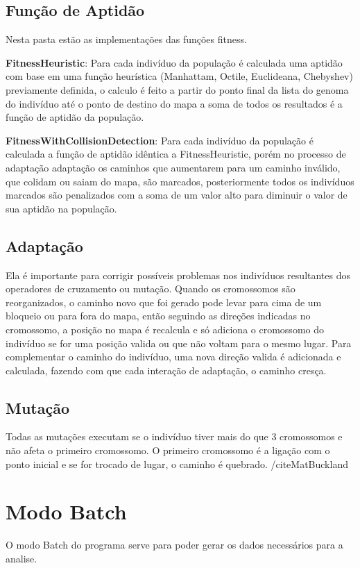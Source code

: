 \subsection{Função de Aptidão}

Nesta pasta estão as implementações das funções fitness.

\textbf{FitnessHeuristic}: Para cada indivíduo da população é calculada uma aptidão com base em uma função heurística (Manhattam, Octile, Euclideana, Chebyshev)
previamente definida, o calculo é feito a partir do ponto final da lista do genoma do indivíduo até o ponto de destino do mapa
a soma de todos os resultados é a função de aptidão da população.

\textbf{FitnessWithCollisionDetection}: Para cada indivíduo da população é calculada a função de aptidão idêntica a FitnessHeuristic, porém no processo de adaptação adaptação os caminhos que aumentarem para um caminho inválido, que colidam ou saiam do mapa, são marcados,
posteriormente todos os indivíduos marcados são penalizados com a  soma de  um valor alto para diminuir o valor de sua aptidão na população.

\subsection{Adaptação}

Ela é importante para corrigir possíveis problemas nos indivíduos resultantes dos operadores de cruzamento ou mutação. Quando os cromossomos são reorganizados, 
o caminho novo que foi gerado pode levar para cima de um bloqueio ou para fora do mapa, então seguindo as direções indicadas no cromossomo, 
a posição no mapa é recalcula e só adiciona o cromossomo do indivíduo se for uma posição valida ou que não voltam para o mesmo lugar.
Para complementar o caminho do indivíduo, uma nova direção valida é adicionada e calculada, fazendo com que cada interação de adaptação, o caminho cresça.

\subsection{Mutação}

Todas as mutações executam se o indivíduo tiver mais do que 3 cromossomos e não afeta o primeiro cromossomo.
O primeiro cromossomo é a ligação com o ponto inicial e se for trocado de lugar, o caminho é quebrado. /cite{MatBuckland}

\section{Modo Batch}

O modo Batch do programa serve para poder gerar os dados necessários para a analise.
